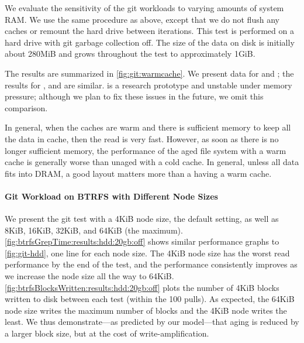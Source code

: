 We evaluate the sensitivity of the git workloads to varying amounts of system
RAM.  We use the same procedure as above, except that we do not flush any
caches or remount the hard drive between iterations.  This test is performed on
a hard drive with git garbage collection off.  The size of the data on disk is
initially about 280MiB and grows throughout the test to approximately 1GiB.



The results are summarized in \cref{fig:git:warmcache}. We present data for \ext
and \ftwofs; the results for \btrfs, \xfs and \zfs are similar. \betrfs is a
research prototype and unstable under memory pressure; although we plan to fix
these issues in the future, we omit this comparison.

In general, when the caches are warm and there is sufficient memory to keep all
the data in cache, then the read is very fast. However, as soon as there is no
longer sufficient memory, the performance of the aged file system with a warm
cache is generally worse than unaged with a cold cache.  In general, unless all
data fits into DRAM, a good layout matters more than a having a warm cache.

\paragraph{Git Workload on BTRFS with Different Node Sizes}
We present the git test with a 4KiB node size, the default setting, as well as
8KiB, 16KiB, 32KiB, and 64KiB (the maximum).
\cref{fig:btrfsGrepTime:results:hdd:20gb:off} shows similar performance graphs
to \cref{fig:git-hdd}, one line for each node size.  The 4KiB node size has
the worst read performance by the end of the test, and the performance
consistently improves as we increase the node size all the way to 64KiB.
\cref{fig:btrfsBlocksWritten:results:hdd:20gb:off} plots the number of 4KiB
blocks written to disk between each test (within the 100 pulls).  As expected,
the 64KiB node size writes the maximum number of blocks and the 4KiB node
writes the least.  We thus demonstrate---as predicted by our model---that aging
is reduced by a larger block size, but at the cost of write-amplification.


